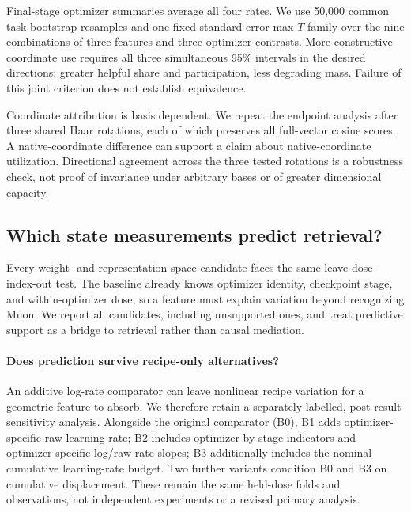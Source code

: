 \documentclass[11pt]{article}
\begin{document}
Final-stage optimizer summaries average all four rates. We use 50,000 common task-bootstrap
resamples and one fixed-standard-error max-$T$ family over the nine combinations of three features
and three optimizer contrasts. More constructive coordinate use requires all three simultaneous
95\% intervals in the desired directions: greater helpful share and participation, less degrading
mass. Failure of this joint criterion does not establish equivalence.

Coordinate attribution is basis dependent. We repeat the endpoint analysis after three shared Haar
rotations, each of which preserves all full-vector cosine scores. A native-coordinate difference can
support a claim about native-coordinate utilization. Directional agreement across the three tested
rotations is a robustness check, not proof of invariance under arbitrary bases or of greater
dimensional capacity.

\DimensionUtilizationFinding

\DimensionUtilizationFigure

\subsection{Which state measurements predict retrieval?}

Every weight- and representation-space candidate faces the same leave-dose-index-out test. The
baseline already knows optimizer identity, checkpoint stage, and within-optimizer dose, so a feature
must explain variation beyond recognizing Muon. We report all candidates, including unsupported
ones, and treat predictive support as a bridge to retrieval rather than causal mediation.

\CorrectedGeometryBridgeFinding

\DimensionRetrievalBridgeFinding

\paragraph{Does prediction survive recipe-only alternatives?}
An additive log-rate comparator can leave nonlinear recipe variation for a geometric feature
to absorb. We therefore retain a separately labelled, post-result sensitivity analysis. Alongside
the original comparator (B0), B1 adds optimizer-specific raw learning rate; B2 includes
optimizer-by-stage indicators and optimizer-specific log/raw-rate slopes; B3 additionally
includes the nominal cumulative learning-rate budget. Two further variants condition B0 and
B3 on cumulative displacement. These remain the same held-dose folds and observations,
not independent experiments or a revised primary analysis.
\RecipeSensitivityFinding
\end{document}

